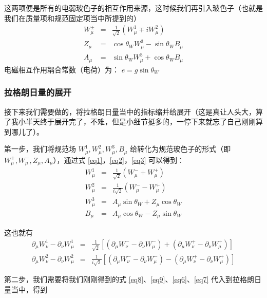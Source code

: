 \documentclass{article}
\begin{document}
这两项便是所有的电弱玻色子的相互作用来源，这时候我们再引入玻色子（也就是我们在质量项和规范固定项当中所提到的）
\begin{eqnarray}
    W_\mu^{\pm} &=& \frac{1}{\sqrt{2}}(W_\mu^1 \mp i W_\mu^2) \label{eq1}\\
    Z_\mu &=& \cos\theta_W W_\mu^3 - \sin\theta_WB_\mu \label{eq2}\\
    A_\mu &=& \sin\theta_W W_\mu^3 + \cos\theta_W B_\mu \label{eq3}
\end{eqnarray}
电磁相互作用耦合常数（电荷）为： $e = g \sin\theta_W$



\subsubsection{拉格朗日量的展开}
接下来我们需要做的，将拉格朗日量当中的指标缩并给展开（这是真让人头大，算了我小半天终于展开完了，不难，但是小细节挺多的，一停下来就忘了自己刚刚算到哪儿了）。

第一步，我们将规范场 $W_\mu^1,W_\mu^2,W_\mu^3,B_\mu$ 给转化为规范玻色子的形式（即 $W_{\mu}^+,W_{\mu}^-,Z_\mu,A_{\mu}$），通过式 \eqref{eq1}，\eqref{eq2}，\eqref{eq3} 可以得到：
\begin{eqnarray}
    W_\mu^1 &=& \frac{1}{\sqrt{2}} \left(W_{\mu}^{-} + W_{\mu}^{+}\right) \label{eq4}\\
    W_\mu^2 &=& \frac{1}{i\sqrt{2}} \left(W_{\mu}^{-} - W_{\mu}^{+}\right) \label{eq5}\\
    W_\mu^3 &=& A_\mu \sin{\theta_W} + Z_\mu \cos{\theta_W} \label{eq6}\\
    B_\mu &=& A_\mu \cos{\theta_W} - Z_\mu \sin{\theta_W} \label{eq7}
\end{eqnarray}

这也就有
\begin{eqnarray}
    \partial_\mu W_\nu^1 -\partial_\nu W_\mu^1 &=& \frac{1}{\sqrt{2}} \left[\left(\partial_\mu W_\nu^- - \partial_\nu W_\mu^-\right) + \left(\partial_\mu W_\nu^+ - \partial_\nu W_\mu^+\right)\right] \label{eq8}\\
    \partial_\mu W_\nu^2 -\partial_\nu W_\mu^2 &=& \frac{1}{i\sqrt{2}} \left[\left(\partial_\mu W_\nu^- - \partial_\nu W_\mu^-\right) - \left(\partial_\mu W_\nu^+ - \partial_\nu W_\mu^+\right)\right] \label{eq9}
\end{eqnarray}

第二步，我们需要将我们刚刚得到的式 \eqref{eq8}、\eqref{eq9}、\eqref{eq6}、\eqref{eq7} 代入到拉格朗日量当中，得到
\end{document}
